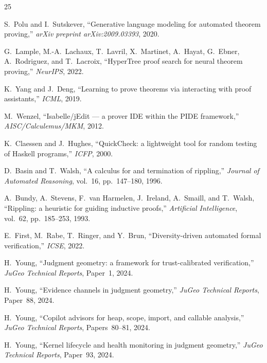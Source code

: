 \documentclass[11pt]{article}
\begin{document}
\begin{thebibliography}{25}

S.~Polu and I.~Sutskever,
``Generative language modeling for automated theorem proving,''
\emph{arXiv preprint arXiv:2009.03393}, 2020.

G.~Lample, M.-A.~Lachaux, T.~Lavril, X.~Martinet,
A.~Hayat, G.~Ebner, A.~Rodriguez, and T.~Lacroix,
``HyperTree proof search for neural theorem proving,''
\emph{NeurIPS}, 2022.

K.~Yang and J.~Deng,
``Learning to prove theorems via interacting with proof
assistants,''
\emph{ICML}, 2019.

M.~Wenzel,
``Isabelle/jEdit --- a prover IDE within the PIDE framework,''
\emph{AISC/Calculemus/MKM}, 2012.

K.~Claessen and J.~Hughes,
``QuickCheck: a lightweight tool for random testing of
Haskell programs,''
\emph{ICFP}, 2000.

D.~Basin and T.~Walsh,
``A calculus for and termination of rippling,''
\emph{Journal of Automated Reasoning}, vol.~16,
pp.~147--180, 1996.

A.~Bundy, A.~Stevens, F.~van Harmelen, J.~Ireland,
A.~Smaill, and T.~Walsh,
``Rippling: a heuristic for guiding inductive proofs,''
\emph{Artificial Intelligence}, vol.~62, pp.~185--253, 1993.

E.~First, M.~Rabe, T.~Ringer, and Y.~Brun,
``Diversity-driven automated formal verification,''
\emph{ICSE}, 2022.

H.~Young,
``Judgment geometry: a framework for trust-calibrated
verification,''
\emph{JuGeo Technical Reports}, Paper~1, 2024.

H.~Young,
``Evidence channels in judgment geometry,''
\emph{JuGeo Technical Reports}, Paper~88, 2024.

H.~Young,
``Copilot advisors for heap, scope, import, and callable
analysis,''
\emph{JuGeo Technical Reports}, Papers~80--81, 2024.

H.~Young,
``Kernel lifecycle and health monitoring in judgment geometry,''
\emph{JuGeo Technical Reports}, Paper~93, 2024.


\end{thebibliography}
\end{document}

